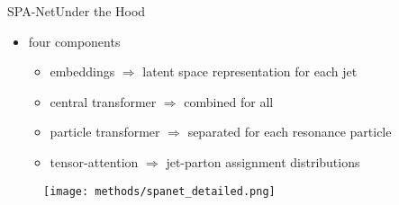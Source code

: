 \documentclass[9pt, aspectratio=169]{beamer}
\begin{document}
\begin{frame}{SPA-Net}{Under the Hood}
    \begin{itemize}
		\item four components
		\begin{itemize}
			\item embeddings $\Rightarrow$ latent space representation for each jet
			\item central transformer $\Rightarrow$ combined for all
			\item particle transformer $\Rightarrow$ separated for each resonance particle
			\item tensor-attention $\Rightarrow$ jet-parton assignment distributions
		\end{itemize}
	\end{itemize}
  
	\begin{figure}
		\centering
		\texttt{[image: methods/spanet\_detailed.png]}
		
		\vspace{-4mm}{\tiny figure taken from SciPost Phys. 12, 178(2022)}
	\end{figure}
\end{frame}
\end{document}
